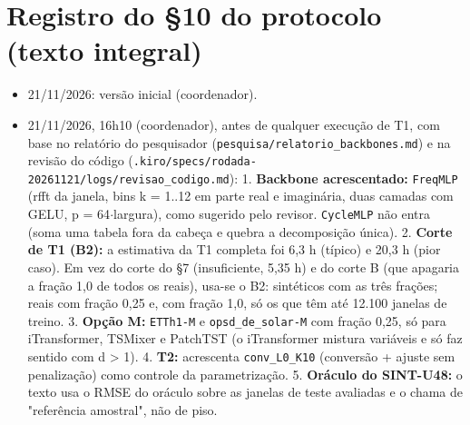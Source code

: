 \documentclass[11pt,a4paper]{article}
\begin{document}
\section{Registro do \S{}10 do protocolo (texto integral)}\label{ap:s10}
\begin{itemize}\setlength{\itemsep}{2pt}\small
\item 21/11/2026: versão inicial (coordenador).
\item 21/11/2026, 16h10 (coordenador), antes de qualquer execução de T1, com base no relatório do pesquisador (\texttt{pesquisa/\allowbreak{}relatorio\_\allowbreak{}backbones.\allowbreak{}md}) e na revisão do código (\texttt{.\allowbreak{}kiro/\allowbreak{}specs/\allowbreak{}rodada-\allowbreak{}20261121/\allowbreak{}logs/\allowbreak{}revisao\_\allowbreak{}codigo.\allowbreak{}md}): 1. \textbf{Backbone acrescentado:} \texttt{FreqMLP} (rfft da janela, bins k = 1..12 em parte real e imaginária, duas camadas com GELU, p = 64$\cdot$largura), como sugerido pelo revisor. \texttt{CycleMLP} não entra (soma uma tabela fora da cabeça e quebra a decomposição única). 2. \textbf{Corte de T1 (B2):} a estimativa da T1 completa foi 6,3 h (típico) e 20,3 h (pior caso). Em vez do corte do \S{}7 (insuficiente, 5,35 h) e do corte B (que apagaria a fração 1,0 de todos os reais), usa-se o B2: sintéticos com as três frações; reais com fração 0,25 e, com fração 1,0, só os que têm até 12.100 janelas de treino. 3. \textbf{Opção M:} \texttt{ETTh1-\allowbreak{}M} e \texttt{opsd\_\allowbreak{}de\_\allowbreak{}solar-\allowbreak{}M} com fração 0,25, só para iTransformer, TSMixer e PatchTST (o iTransformer mistura variáveis e só faz sentido com d > 1). 4. \textbf{T2:} acrescenta \texttt{conv\_\allowbreak{}L0\_\allowbreak{}K10} (conversão + ajuste sem penalização) como controle da parametrização. 5. \textbf{Oráculo do SINT-U48:} o texto usa o RMSE do oráculo sobre as janelas de teste avaliadas e o chama de "referência amostral", não de piso.

\end{itemize}
\end{document}
